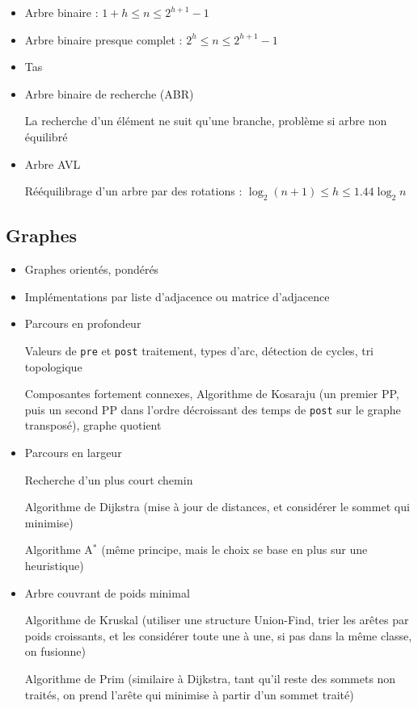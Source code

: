 \documentclass[10pt,a4paper]{article}
\begin{document}
%
\begin{itemize}[noitemsep]
	\item Arbre binaire : \(  1+h \leq n \leq 2^{h+1}-1  \)
	\item Arbre binaire presque complet : %
		\(  2^h \leq n \leq 2^{h+1}-1  \)
	\item Tas
	\item Arbre binaire de recherche (ABR)
	
		La recherche d'un élément ne suit qu'une branche, problème si arbre non équilibré
	\item Arbre AVL
	
		Rééquilibrage d'un arbre par des rotations :
		\(  \log _2(n+1) \leq h \leq 1.44\log _2 n  \)
	
\end{itemize}
%



\subsection{Graphes}

%
\begin{itemize}[noitemsep]
	\item Graphes orientés, pondérés
	\item Implémentations par liste d'adjacence ou matrice d'adjacence
	\item Parcours en profondeur
	
		Valeurs de \texttt{pre} et \texttt{post} traitement, types d'arc, détection de cycles, tri topologique
		
		Composantes fortement  connexes, Algorithme de Kosaraju (un premier PP, puis un second PP dans l'ordre décroissant des temps de \texttt{post} sur le graphe transposé), graphe quotient
	\item Parcours en largeur
	
		Recherche d'un plus court chemin
		
		Algorithme de Dijkstra (mise à jour de distances, et considérer le sommet qui minimise)
		
		Algorithme A\(^*\) (même principe, mais le choix se base en plus sur une heuristique)
	\item Arbre couvrant de poids minimal
	
	Algorithme de Kruskal (utiliser une structure Union-Find, trier les arêtes par poids croissants, et les considérer toute une à une, si pas dans la même classe, on fusionne)
	
	Algorithme de Prim (similaire à Dijkstra, tant qu'il reste des sommets non traités, on prend l'arête qui minimise à partir d'un sommet traité)
\end{itemize}
%
\end{document}
